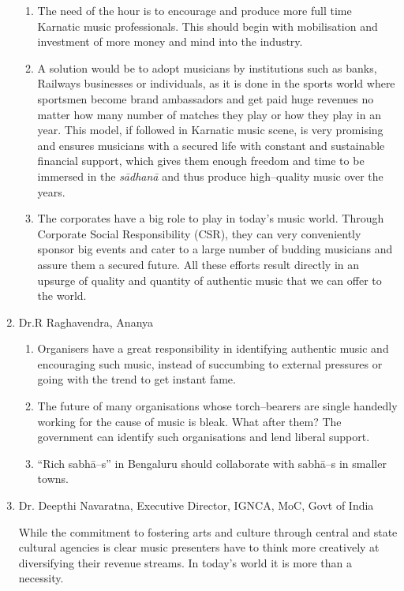 \begin{enumerate}
\begin{enumerate}
 \item The need of the hour is to encourage and produce more full time Karnatic music professionals. This should begin with mobilisation and investment of more money and mind into the industry.

 \item A solution would be to adopt musicians by institutions such as banks, Railways businesses or individuals, as it is done in the sports world where sportsmen become brand ambassadors and get paid huge revenues no matter how many number of matches they play or how they play in an year. This model, if followed in Karnatic music scene, is very promising and ensures musicians with a secured life with constant and sustainable financial support, which gives them enough freedom and time to be immersed in the \textit{sādhanā} and thus produce high–quality music over the years.

 \item The corporates have a big role to play in today’s music world. Through Corporate Social Responsibility (CSR), they can very conveniently sponsor big events and cater to a large number of budding musicians and assure them a secured future. All these efforts result directly in an upsurge of quality and quantity of authentic music that we can offer to the world.
\end{enumerate}

 \item Dr.R Raghavendra, Ananya
 
\begin{enumerate}
\item Organisers have a great responsibility in identifying authentic music and encouraging such music, instead of succumbing to external pressures or going with the trend to get instant fame.

 \item The future of many organisations whose torch–bearers are single handedly working for the cause of music is bleak. What after them? The government can identify such organisations and lend liberal support.

 \item “Rich sabhā–s” in Bengaluru should collaborate with sabhā–s in smaller towns.
\end{enumerate}

 \item 
 Dr. Deepthi Navaratna, Executive Director, IGNCA, MoC, Govt of India

 While the commitment to fostering arts and culture through central and state cultural agencies is clear music presenters have to think more creatively at diversifying their revenue streams. In today’s world it is more than a necessity.

\end{enumerate}


